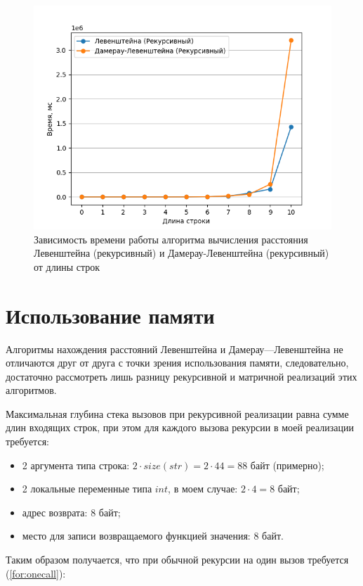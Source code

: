 \begin{figure}[h]
	\centering
	\includegraphics[scale=0.4]{imgs/1.png}
	\caption{Зависимость времени работы алгоритма вычисления
расстояния Левенштейна (рекурсивный) и Дамерау-Левенштейна (рекурсивный) от длины строк}
	\label{img:profiling2}
\end{figure}


\section{Использование памяти}

Алгоритмы нахождения расстояний Левенштейна и Дамерау—Левенштейна не отличаются друг от друга с точки зрения использования памяти, следовательно, достаточно рассмотреть лишь разницу рекурсивной и матричной реализаций этих алгоритмов.

Максимальная глубина стека вызовов при рекурсивной реализации равна сумме длин входящих строк, при этом для каждого вызова рекурсии в моей реализации требуется:

\begin{itemize}
    \item 2 аргумента типа строка: $2 \cdot size(str) = 2 \cdot 44 = 88$ байт (примерно);
    \item 2 локальные переменные типа $int$, в моем случае: $2 \cdot 4 = 8$ байт;
    \item адрес возврата: 8 байт;
    \item место для записи возвращаемого функцией значения: 8 байт.
\end{itemize}
Таким образом получается, что при обычной рекурсии на один вызов требуется (\ref{for:onecall}): 

